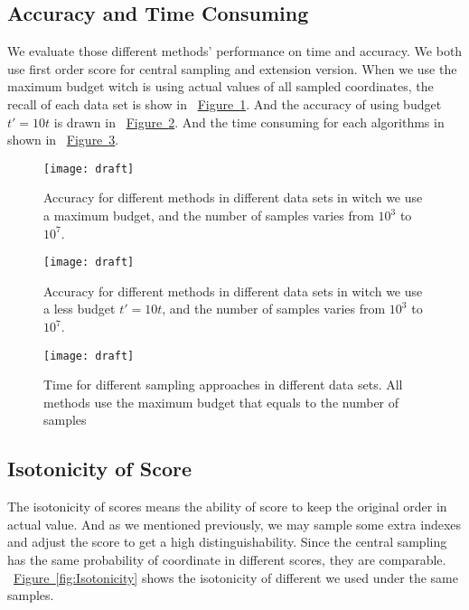 \documentclass[letterpaper]{article}
\newcommand{\Fig}[1] {\hyperref[fig:#1] {Figure~\ref*{fig:#1}}} %
\begin{document}
\subsection{Accuracy and Time Consuming}

We evaluate those different methods' performance on time and accuracy. We both use first order score for central sampling and extension version.
When we use the maximum budget witch is using actual values of all sampled coordinates, the recall of each data set is show in ~\Fig{RecallMaxBudget}. And the accuracy of using budget $t'=10t$ is drawn in ~\Fig{RecallBudget}. And the time consuming for each algorithms in shown in ~\Fig{Time}.
\begin{figure}[ht]
  \centering
  \texttt{[image: draft]}\\
  \caption{Accuracy for different methods in different data sets in witch we use a maximum budget, and the number of samples varies from $10^3$ to $10^7$.}
  \label{fig:RecallMaxBudget}
\end{figure}

\begin{figure}[ht]
  \centering
  \texttt{[image: draft]}\\
  \caption{Accuracy for different methods in different data sets in witch we use a less budget $t'=10t$, and the number of samples varies from $10^3$ to $10^7$.}
  \label{fig:RecallBudget}
\end{figure}

\begin{figure}[ht]
  \centering
  \texttt{[image: draft]}\\
  \caption{Time for different sampling approaches in different data sets. All methods use the maximum budget that equals to the number of samples}
  \label{fig:Time}
\end{figure}
\subsection{Isotonicity of Score}
The isotonicity of scores means the ability of score to keep the original order in actual value. And as we mentioned previously, we may sample some extra indexes and adjust the score to get a high distinguishability. Since the central sampling has the same probability of coordinate in different scores, they are comparable. ~\Fig{Isotonicity} shows the isotonicity of different we used under the same samples.
\end{document}
